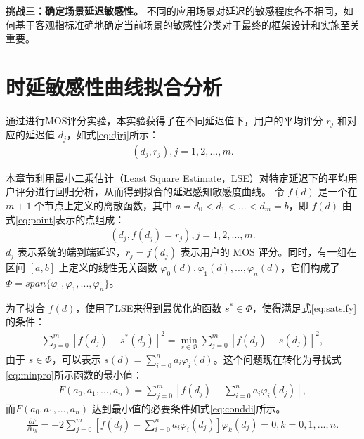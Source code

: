 \textbf{挑战三：确定场景延迟敏感性。} 不同的应用场景对延迟的敏感程度各不相同，如何基于客观指标准确地确定当前场景的敏感性分类对于最终的框架设计和实施至关重要。

\section{时延敏感性曲线拟合分析}\label{sec-latency-curve} 
通过进行MOS评分实验，本实验获得了在不同延迟值下，用户的平均评分 $r_j$ 和对应的延迟值 $d_j$，如式\eqref{eq:djrj}所示： 
\begin{equation}
\begin{aligned}
    (d_j, r_j),  j= 1, 2, ..., m.
\end{aligned}
\label{eq:djrj}
\end{equation}

本章节利用最小二乘估计（Least Square Estimate，LSE）对特定延迟下的平均用户评分进行回归分析，从而得到拟合的延迟感知敏感度曲线。
令 $f(d)$ 是一个在 $m+1$ 个节点上定义的离散函数，其中 $a = d_0 < d_1 < \dots < d_m = b$，即 $f(d)$ 由式\eqref{eq:point}表示的点组成：
\begin{equation}
\begin{aligned}
    (d_j, f(d_j) = r_j),  j= 1, 2, ..., m.
\end{aligned}
\label{eq:point}
\end{equation}
$d_j$ 表示系统的端到端延迟，$r_j = f(d_j)$ 表示用户的 MOS 评分。同时，有一组在区间 $[a,b]$ 上定义的线性无关函数 $\varphi_0(d), \varphi_1(d), ..., \varphi_n(d)$，它们构成了 $\Phi = span\{\varphi_0, \varphi_1, ..., \varphi_n\}$。

为了拟合 $f(d)$，使用了LSE来得到最优化的函数 $s^* \in \Phi$，使得满足式\eqref{eq:satsify}的条件：
\begin{equation}
\begin{aligned}
    \sum^{m}_{j=0}[f(d_j)-s^*(d_j)]^2 = \min_{s \in \Phi} \sum^{m}_{j=0}[f(d_j)-s(d_j)]^2,
\end{aligned}
\label{eq:satsify}
\end{equation}
由于 $s \in \Phi$，可以表示 $s(d) = \sum^{n}_{i=0}a_i\varphi_i(d)$。这个问题现在转化为寻找式\eqref{eq:minpro}所示函数的最小值：
\begin{equation}
\begin{aligned}
    F(a_0, a_1, ..., a_n) = \sum^{m}_{j=0}\left[f(d_j)-\sum^{n}_{i=0}a_i\varphi_i(d_j)\right],
\end{aligned}
\label{eq:minpro}
\end{equation}
而$F(a_0, a_1, ..., a_n)$ 达到最小值的必要条件如式\eqref{eq:conddi}所示。
\begin{equation}
\begin{aligned}
    \frac{\partial F}{\partial a_k} = -2\sum^{m}_{j=0}\left[f(d_j)-\sum^{n}_{i=0}a_i\varphi_i(d_j)\right]\varphi_k(d_j)= 0, k = 0, 1, ..., n.
\end{aligned}
\label{eq:conddi}
\end{equation}


